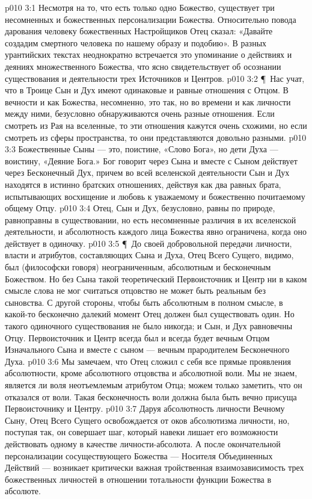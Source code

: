 \vs p010 3:1 Несмотря на то, что есть только одно Божество, существует три несомненных и божественных персонализации Божества. Относительно повода дарования человеку божественных Настройщиков Отец сказал: «Давайте создадим смертного человека по нашему образу и подобию». В разных урантийских текстах неоднократно встречается это упоминание о действиях и деяниях множественного Божества, что ясно свидетельствует об осознании существования и деятельности трех Источников и Центров.
\vs p010 3:2 \P\ Нас учат, что в Троице Сын и Дух имеют одинаковые и равные отношения с Отцом. В вечности и как Божества, несомненно, это так, но во времени и как личности между ними, безусловно обнаруживаются очень разные отношения. Если смотреть из Рая на вселенные, то эти отношения кажутся очень схожими, но если смотреть из сферы пространства, то они представляются довольно разными.
\vs p010 3:3 Божественные Сыны --- это, поистине, «Слово Бога», но дети Духа --- воистину, «Деяние Бога.» Бог говорит через Сына и вместе с Сыном действует через Бесконечный Дух, причем во всей вселенской деятельности Сын и Дух находятся в истинно братских отношениях, действуя как два равных брата, испытывающих восхищение и любовь к уважаемому и божественно почитаемому общему Отцу.
\vs p010 3:4 Отец, Сын и Дух, безусловно, равны по природе, равноправны в существовании, но есть несомненные различия в их вселенской деятельности, и абсолютность каждого лица Божества явно ограничена, когда оно действует в одиночку.
\vs p010 3:5 \P\ До своей добровольной передачи личности, власти и атрибутов, составляющих Сына и Духа, Отец Всего Сущего, видимо, был (философски говоря) неограниченным, абсолютным и бесконечным Божеством. Но без Сына такой теоретический Первоисточник и Центр ни в каком смысле слова не мог считаться  отцовство не может быть реальным без сыновства. С другой стороны, чтобы быть абсолютным в полном смысле, в какой\hyp{}то бесконечно далекий момент Отец должен был существовать один. Но такого одиночного существования не было никогда; и Сын, и Дух равновечны Отцу. Первоисточник и Центр всегда был и всегда будет вечным Отцом Изначального Сына и вместе с сыном --- вечным прародителем Бесконечного Духа.
\vs p010 3:6 Мы замечаем, что Отец сложил с себя все прямые проявления абсолютности, кроме абсолютного отцовства и абсолютной воли. Мы не знаем, является ли воля неотъемлемым атрибутом Отца; можем только заметить, что он  отказался от воли. Такая бесконечность воли должна была быть вечно присуща Первоисточнику и Центру.
\vs p010 3:7 Даруя абсолютность личности Вечному Сыну, Отец Всего Сущего освобождается от оков абсолютизма личности, но, поступая так, он совершает шаг, который навеки лишает его возможности действовать одному в качестве личности\hyp{}абсолюта. А после окончательной персонализации сосуществующего Божества --- Носителя Объединенных Действий --- возникает критически важная тройственная взаимозависимость трех божественных личностей в отношении тотальности функции Божества в абсолюте.
